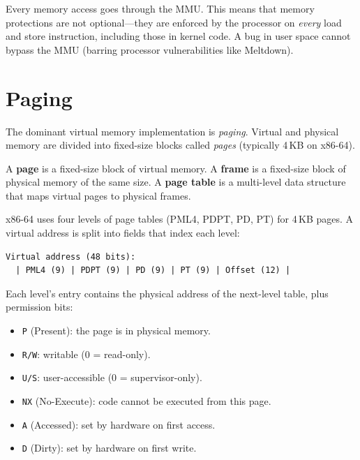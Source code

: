 \begin{principle}
	Every memory access goes through the MMU. This means that memory protections are not optional---they are enforced by the processor on \emph{every} load and store instruction, including those in kernel code. A bug in user space cannot bypass the MMU (barring processor vulnerabilities like Meltdown).
\end{principle}

\section{Paging}

The dominant virtual memory implementation is \emph{paging}. Virtual and physical memory are divided into fixed-size blocks called \emph{pages} (typically 4\,KB on x86-64).

\begin{definition}
	A \textbf{page} is a fixed-size block of virtual memory. A \textbf{frame} is a fixed-size block of physical memory of the same size. A \textbf{page table} is a multi-level data structure that maps virtual pages to physical frames.
\end{definition}

x86-64 uses four levels of page tables (PML4, PDPT, PD, PT) for 4\,KB pages. A virtual address is split into fields that index each level:

\begin{lstlisting}[caption=Virtual address layout on x86-64 (4KB pages)]
  Virtual address (48 bits):
  | PML4 (9) | PDPT (9) | PD (9) | PT (9) | Offset (12) |
\end{lstlisting}

Each level's entry contains the physical address of the next-level table, plus permission bits:

\begin{itemize}
	\item \texttt{P} (Present): the page is in physical memory.
	\item \texttt{R/W}: writable (0 = read-only).
	\item \texttt{U/S}: user-accessible (0 = supervisor-only).
	\item \texttt{NX} (No-Execute): code cannot be executed from this page.
	\item \texttt{A} (Accessed): set by hardware on first access.
	\item \texttt{D} (Dirty): set by hardware on first write.
\end{itemize}

